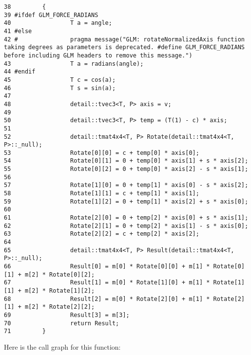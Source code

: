 \begin{Code}\begin{verbatim}38         {
39 #ifdef GLM_FORCE_RADIANS
40                 T a = angle;
41 #else
42 #               pragma message("GLM: rotateNormalizedAxis function taking degrees as parameters is deprecated. #define GLM_FORCE_RADIANS before including GLM headers to remove this message.")
43                 T a = radians(angle);
44 #endif
45                 T c = cos(a);
46                 T s = sin(a);
47 
48                 detail::tvec3<T, P> axis = v;
49 
50                 detail::tvec3<T, P> temp = (T(1) - c) * axis;
51 
52                 detail::tmat4x4<T, P> Rotate(detail::tmat4x4<T, P>::_null);
53                 Rotate[0][0] = c + temp[0] * axis[0];
54                 Rotate[0][1] = 0 + temp[0] * axis[1] + s * axis[2];
55                 Rotate[0][2] = 0 + temp[0] * axis[2] - s * axis[1];
56 
57                 Rotate[1][0] = 0 + temp[1] * axis[0] - s * axis[2];
58                 Rotate[1][1] = c + temp[1] * axis[1];
59                 Rotate[1][2] = 0 + temp[1] * axis[2] + s * axis[0];
60 
61                 Rotate[2][0] = 0 + temp[2] * axis[0] + s * axis[1];
62                 Rotate[2][1] = 0 + temp[2] * axis[1] - s * axis[0];
63                 Rotate[2][2] = c + temp[2] * axis[2];
64 
65                 detail::tmat4x4<T, P> Result(detail::tmat4x4<T, P>::_null);
66                 Result[0] = m[0] * Rotate[0][0] + m[1] * Rotate[0][1] + m[2] * Rotate[0][2];
67                 Result[1] = m[0] * Rotate[1][0] + m[1] * Rotate[1][1] + m[2] * Rotate[1][2];
68                 Result[2] = m[0] * Rotate[2][0] + m[1] * Rotate[2][1] + m[2] * Rotate[2][2];
69                 Result[3] = m[3];
70                 return Result;
71         }
\end{verbatim}
\end{Code}




Here is the call graph for this function: